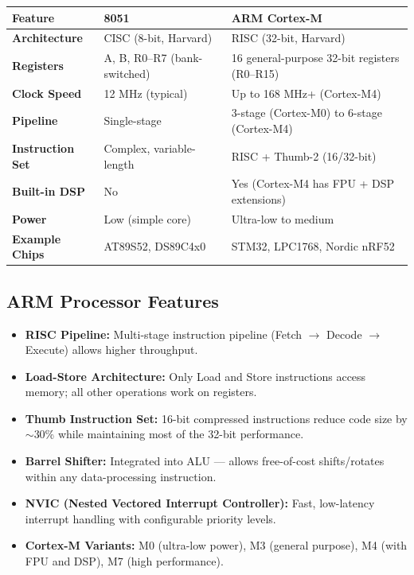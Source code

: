 \documentclass[12pt,a4paper]{article}
\renewcommand{\arraystretch}{1.45}
\begin{document}
\par\noindent
{\renewcommand{\arraystretch}{1.6}%
\begin{tabularx}{\linewidth}{|B{3.0cm}|Y|Y|}
\hline
\textbf{Feature} & \textbf{8051} & \textbf{ARM Cortex-M} \\
\hline
\textbf{Architecture} & CISC (8-bit, Harvard) & RISC (32-bit, Harvard) \\
\hline
\textbf{Registers} & A, B, R0--R7 (bank-switched) & 16 general-purpose 32-bit registers (R0--R15) \\
\hline
\textbf{Clock Speed} & 12 MHz (typical) & Up to 168 MHz+ (Cortex-M4) \\
\hline
\textbf{Pipeline} & Single-stage & 3-stage (Cortex-M0) to 6-stage (Cortex-M4) \\
\hline
\textbf{Instruction Set} & Complex, variable-length & RISC + Thumb-2 (16/32-bit) \\
\hline
\textbf{Built-in DSP} & No & Yes (Cortex-M4 has FPU + DSP extensions) \\
\hline
\textbf{Power} & Low (simple core) & Ultra-low to medium \\
\hline
\textbf{Example Chips} & AT89S52, DS89C4x0 & STM32, LPC1768, Nordic nRF52 \\
\hline
\end{tabularx}}

\subsection{ARM Processor Features}
\begin{itemize}[leftmargin=*, itemsep=3pt]
  \item \textbf{RISC Pipeline:} Multi-stage instruction pipeline (Fetch $\to$ Decode $\to$ Execute) allows higher throughput.
  \item \textbf{Load-Store Architecture:} Only Load and Store instructions access memory; all other operations work on registers.
  \item \textbf{Thumb Instruction Set:} 16-bit compressed instructions reduce code size by $\sim$30\% while maintaining most of the 32-bit performance.
  \item \textbf{Barrel Shifter:} Integrated into ALU --- allows free-of-cost shifts/rotates within any data-processing instruction.
  \item \textbf{NVIC (Nested Vectored Interrupt Controller):} Fast, low-latency interrupt handling with configurable priority levels.
  \item \textbf{Cortex-M Variants:} M0 (ultra-low power), M3 (general purpose), M4 (with FPU and DSP), M7 (high performance).
\end{itemize}
\end{document}
